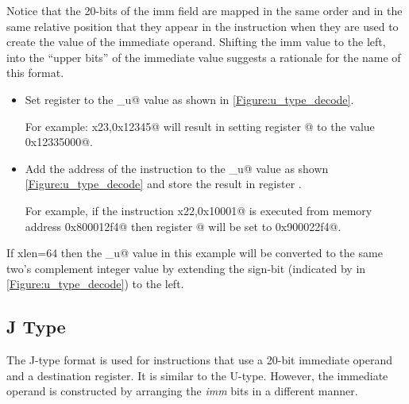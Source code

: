 Notice that the 20-bits of the imm field are mapped in the same order and 
in the same relative position that they appear in the instruction when 
they are used to create the value of the immediate operand.  
Shifting the imm value to the left, into the ``upper bits'' of the immediate 
value suggests a rationale for the name of this format.



\begin{itemize}
\item{}
\label{insn:lui}

Set register \verb@rd@ to the \verb@imm_u@ value as shown in \autoref{Figure:u_type_decode}.  

For example: \verb@lui x23,0x12345@ will result in setting register @ to 
the value \verb@0x12335000@.

\item{}
\label{insn:auipc}

Add the address of the instruction to the \verb@imm_u@ value as 
shown \autoref{Figure:u_type_decode} and store the result in register \verb@rd@.

For example, if the instruction \verb@auipc x22,0x10001@ is executed from
memory address \verb@0x800012f4@ then register @ will be set to 
\verb@0x900022f4@.
\end{itemize}



If \Gls{xlen}=64 then the \verb@imm_u@ value in this example will be converted to the
same two's complement integer value by extending the sign-bit (indicated by \verb@a@ 
in \autoref{Figure:u_type_decode}) to the left.




\subsection{J Type}
\label{insnformat:jtype}

The J-type format is used for instructions that use a 20-bit immediate operand
and a destination register.  It is similar to the U-type.  However, the immediate
operand is constructed by arranging the {\em imm} bits in a different manner.

